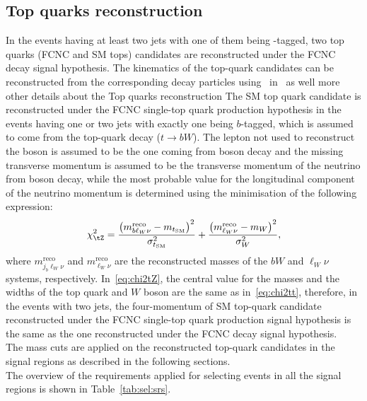 \subsection {Top quarks reconstruction}
In the events having at least two jets with one of them being \Pqb-tagged, two top quarks (FCNC and SM tops) candidates are reconstructed under the FCNC \ttbar decay signal hypothesis.
The kinematics of the top-quark candidates can be reconstructed from
the corresponding decay particles using~ in~ as well more other details about the Top quarks reconstruction
The SM top quark candidate is reconstructed under the FCNC single-top quark production hypothesis in the events having one or two jets with exactly one being $b$-tagged,
which is assumed to come from the top-quark decay ($t\to bW$). 
The lepton not used to reconstruct the \PZ boson is assumed to be the one coming from \PW boson decay
and the missing transverse momentum is assumed to be the transverse momentum of the neutrino from \PW boson decay,
while the most probable value for the longitudinal component of the neutrino momentum is determined using the minimisation of the following expression:
\begin{equation}
\chi^2_{\tZ}  = 
\frac{\left(m^{\mathrm{reco}}_{b\ell_W\nu}-m_{t_{\mathrm{SM}}}\right)^2}{\sigma_{t_{\mathrm{SM}}}^2}
+ \frac{\left(m^{\mathrm{reco}}_{\ell_W\nu}-m_W\right)^2}{\sigma_W^2},
\label{eq:chi2tZ}
\end{equation}
where $m^{\mathrm{reco}}_{j_b\ell_W\nu}$ and $m^{\mathrm{reco}}_{\ell_W\nu}$ are 
the reconstructed masses of the $bW$ and $\ell_W\nu$ systems, respectively.
In~\cref{eq:chi2tZ}, the central value for the masses and the widths
of the top quark and $W$ boson are
the same as in~\cref{eq:chi2tt}, therefore, in the events with two jets,
the four-momentum of SM top-quark candidate reconstructed under the FCNC single-top quark
production signal hypothesis is the same as the one
reconstructed under the FCNC \ttbar decay signal hypothesis.\\
The mass cuts are applied on the reconstructed top-quark candidates in the signal regions as described in the following sections.\\
The overview of the requirements applied for selecting events in all the signal regions is shown in Table~\ref{tab:sel:srs}. 

